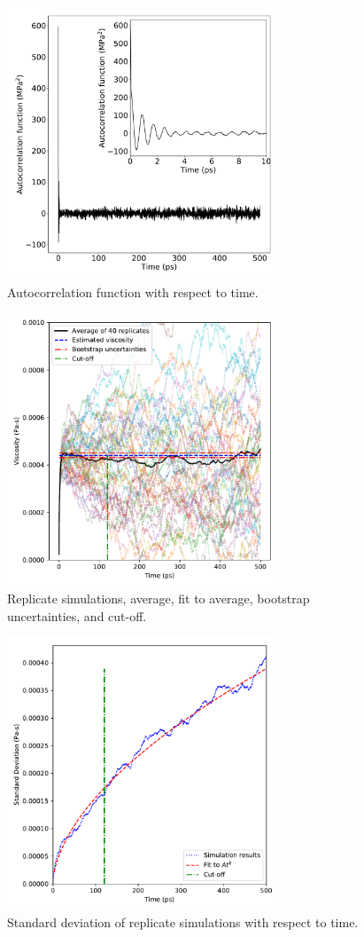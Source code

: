 \documentclass[preprint,review,12pt]{elsarticle}
\begin{document}
	\begin{figure}[htb!]
		\centering
		\includegraphics[width=3.2in]{autocorrelation_function.pdf}
		\caption{Autocorrelation function with respect to time.}
		\label{fig:autocorrelation}
	\end{figure} 

	\begin{figure}[htb!]
		\centering
		\includegraphics[width=3.2in]{GK_MCMC_all_rho0.pdf}
		\caption{Replicate simulations, average, fit to average, bootstrap uncertainties, and cut-off.}
		\label{fig:replicates}
	\end{figure} 

	\begin{figure}[htb!]
		\centering
		\includegraphics[width=3.2in]{sig_fit_rho0.pdf}
		\caption{Standard deviation of replicate simulations with respect to time.}
		\label{fig:standard_deviation}
	\end{figure} 
\end{document}
